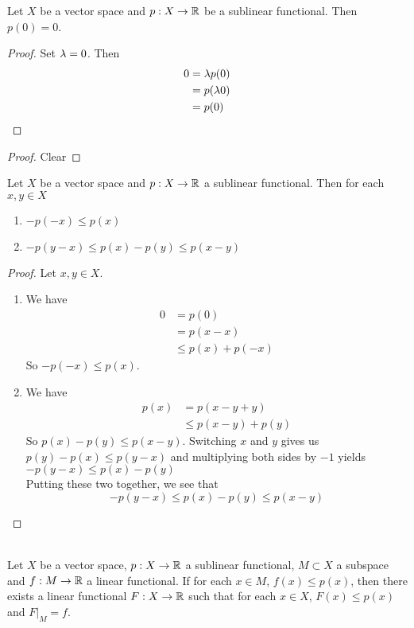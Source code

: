 \documentclass{book}
\begin{document}
	\begin{ex} 
		Let $X$ be a vector space and $p: X \rightarrow \mathbb{R}$ be a sublinear functional. Then $p(0) = 0$.
	\end{ex}
	
	\begin{proof} Set $\lambda = 0$. Then 
		\begin{align*}
			0
			&= \lambda p(0) \\
			&= p(\lambda 0) \\
			&= p(0)
		\end{align*}
	\end{proof}
	
	\begin{proof}
		Clear
	\end{proof}
	
	\begin{ex} 
		Let $X$ be a vector space and $p:X \rightarrow \mathbb{R}$ a sublinear functional. Then for each $x, y \in X$
		\begin{enumerate}
			\item $-p(-x) \leq p(x)$
			\item $- p(y-x) \leq p(x) - p(y) \leq p(x-y)$
		\end{enumerate}
	\end{ex}
	
	\begin{proof}
		Let $x, y \in X$.
		\begin{enumerate}
			\item We have
			\begin{align*}
				0
				&= p(0) \\ 
				&= p(x - x) \\
				& \leq p(x) + p(-x)
			\end{align*}
			So $-p(-x) \leq p(x)$.
			\item We have
			\begin{align*}
				p(x)
				&= p(x -y + y) \\
				& \leq p(x-y) + p(y)
			\end{align*}
			So $p(x) - p(y) \leq p(x-y)$. Switching $x$ and $y$ gives us $p(y) - p(x) \leq p(y-x)$ and multiplying both sides by $-1$ yields $-p(y-x) \leq p(x) - p(y)$ \\ 
			Putting these two together, we see that $$-p(y-x) \leq p(x) - p(y) \leq p(x-y)$$
		\end{enumerate}
	\end{proof}
	
	
	
	\begin{thm}\\
		Let $X$ be a vector space, $p:X \rightarrow \mathbb{R}$ a sublinear functional, $M \subset X$ a subspace and $f:M \rightarrow \mathbb{R}$ a linear functional. If for each $x \in M$, $ f(x)  \leq p(x)$, then there exists a linear functional $F:X \rightarrow \mathbb{R}$ such that for each $x \in X$, $F(x) \leq p(x)$ and $F|_{M}=f$.
	\end{thm}
	
\end{document}
